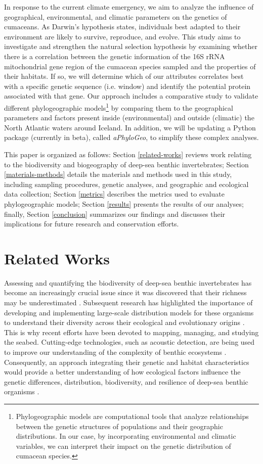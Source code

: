 In response to the current climate emergency, we aim to analyze the influence of geographical, environmental, and climatic parameters on the genetics of cumaceans. As Darwin's hypothesis states, individuals best adapted to their environment are likely to survive, reproduce, and evolve. This study aims to investigate and strengthen the natural selection hypothesis by examining whether there is a correlation between the genetic information of the 16S rRNA mitochondrial gene region of the cumacean species sampled and the properties of their habitats. If so, we will determine which of our attributes correlates best with a specific genetic sequence (i.e. window) and identify the potential protein associated with that gene. Our approach includes a comparative study to validate different {phylogeographic models}\footnote{Phylogeographic models are computational tools that analyze relationships between the genetic structures of populations and their geographic distributions. In our case, by incorporating environmental and climatic variables, we can interpret their impact on the genetic distribution of cumacean species.} by comparing them to the geographical parameters and factors present inside (environmental) and outside (climatic) the North Atlantic waters around Iceland. In addition, we will be updating a Python package (currently in beta), called \textit{aPhyloGeo}, to simplify these complex analyses.

This paper is organized as follows: Section \autoref{related-works} reviews work relating to the biodiversity and biogeography of deep-sea benthic invertebrates; Section \autoref{materials-methods} details the materials and methods used in this study, including sampling procedures, genetic analyses, and geographic and ecological data collection; Section \autoref{metrics} describes the metrics used to evaluate phylogeographic models; Section \autoref{results} presents the results of our analyses; finally, Section \autoref{conclusion} summarizes our findings and discusses their implications for future research and conservation efforts.

\section{Related Works}\label{related-works}
Assessing and quantifying the biodiversity of deep-sea benthic invertebrates has become an increasingly crucial issue since it was discovered that their richness may be underestimated \citep{grassle1992deep}. Subsequent research has highlighted the importance of developing and implementing large-scale distribution models for these organisms to understand their diversity across their ecological and evolutionary origins \citep{rex1997large}. This is why recent efforts have been devoted to mapping, managing, and studying the seabed. Cutting-edge technologies, such as acoustic detection, are being used to improve our understanding of the complexity of benthic ecosystems \citep{brown2011benthic}. Consequently, an approach integrating their genetic and habitat characteristics would provide a better understanding of how ecological factors influence the genetic differences, distribution, biodiversity, and resilience of deep-sea benthic organisms \citep{etter1990population, vrijenhoek2009cryptic}.

